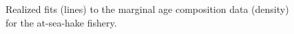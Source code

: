 \documentclass[
]{scrartcl}
\begin{document}
\begin{figure}[H]


\caption{\label{fig-marage_ashop}Realized fits (lines) to the marginal
age composition data (density) for the at-sea-hake fishery.}

\end{figure}%
\end{document}
